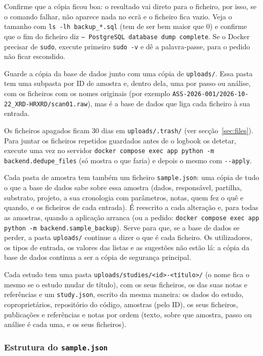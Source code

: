 \documentclass[11pt,a4paper]{article}
\begin{document}
Confirme que a cópia ficou boa: o resultado vai direto para o ficheiro, por
isso, se o comando falhar, não aparece nada no ecrã e o ficheiro fica vazio.
Veja o tamanho com \texttt{ls -lh backup\_*.sql} (tem de ser bem maior que 0) e
confirme que o fim do ficheiro diz \texttt{-- PostgreSQL database dump complete}.
Se o Docker precisar de \texttt{sudo}, execute primeiro \texttt{sudo -v} e dê a
palavra-passe, para o pedido não ficar escondido.

Guarde a cópia da base de dados junto com uma cópia de \texttt{uploads/}.
Essa pasta tem uma subpasta por ID de amostra e, dentro dela, uma por
passo ou análise, com os ficheiros com os nomes originais (por exemplo
\nolinkurl{ASS-2026-001/2026-10-22_XRD-HRXRD/scan01.raw}), mas é a base de
dados que liga cada ficheiro à sua entrada.

Os ficheiros apagados ficam 30 dias em \nolinkurl{uploads/.trash/} (ver
secção~\ref{sec:files}). Para juntar os ficheiros repetidos guardados antes
de o logbook os detetar, execute uma vez no servidor
\texttt{docker compose exec app python -m backend.dedupe\_files} (só mostra o
que faria) e depois o mesmo com \texttt{-{}-apply}.

Cada pasta de amostra tem também um ficheiro \texttt{sample.json}: uma
cópia de tudo o que a base de dados sabe sobre essa amostra (dados,
responsável, partilha, substrato, projeto, a sua cronologia com parâmetros,
notas, quem fez o quê e quando, e os ficheiros de cada entrada). É
reescrito a cada alteração e, para todas as amostras, quando a aplicação
arranca (ou a pedido: \texttt{docker compose exec app python -m backend.sample\_backup}). Serve para que, se a base de dados se perder, a pasta
\texttt{uploads/} continue a dizer o que é cada ficheiro. Os utilizadores,
os tipos de entrada, os valores das listas e as sugestões não estão lá: a
cópia da base de dados continua a ser a cópia de segurança principal.

Cada estudo tem uma pasta \texttt{uploads/studies/<id>-<título>/} (o nome
fica o mesmo se o estudo mudar de título), com os seus ficheiros, os das suas
notas e referências e um \texttt{study.json}, escrito da mesma maneira: os dados do estudo,
coproprietários, repositório do código, amostras (pelo ID), os seus ficheiros, publicações e
referências e notas por ordem (texto,
sobre que amostra, passo ou análise é cada uma, e os seus ficheiros).

\subsubsection*{Estrutura do \texttt{sample.json}}
\end{document}
